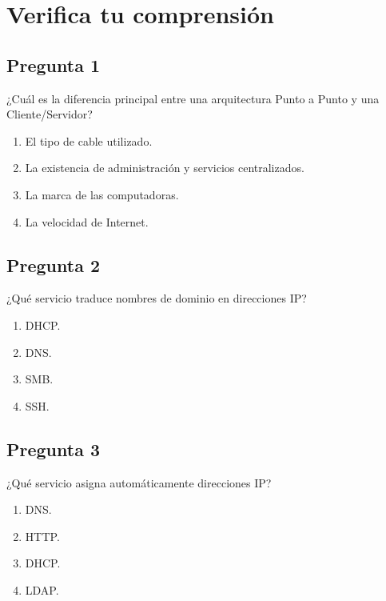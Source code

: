 \documentclass[
  spanish,
  letterpaper,
]{scrbook}
\providecommand{\tightlist}{%
  \setlength{\itemsep}{0pt}\setlength{\parskip}{0pt}}
\begin{document}

\chapter{Verifica tu comprensión}\label{verifica-tu-comprensiuxf3n}

\section{Pregunta 1}\label{pregunta-1}

¿Cuál es la diferencia principal entre una arquitectura Punto a Punto y
una Cliente/Servidor?

\begin{enumerate}
\def\labelenumi{\alph{enumi}.}
\tightlist
\item
  El tipo de cable utilizado.\\
\item
  La existencia de administración y servicios centralizados.\\
\item
  La marca de las computadoras.\\
\item
  La velocidad de Internet.
\end{enumerate}

\section{Pregunta 2}\label{pregunta-2}

¿Qué servicio traduce nombres de dominio en direcciones IP?

\begin{enumerate}
\def\labelenumi{\alph{enumi}.}
\tightlist
\item
  DHCP.\\
\item
  DNS.\\
\item
  SMB.\\
\item
  SSH.
\end{enumerate}

\section{Pregunta 3}\label{pregunta-3}

¿Qué servicio asigna automáticamente direcciones IP?

\begin{enumerate}
\def\labelenumi{\alph{enumi}.}
\tightlist
\item
  DNS.\\
\item
  HTTP.\\
\item
  DHCP.\\
\item
  LDAP.
\end{enumerate}
\end{document}
